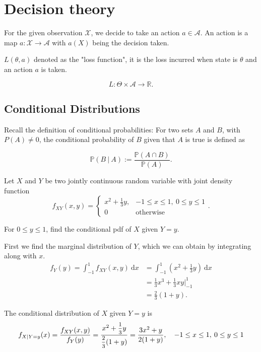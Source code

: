 \chapter{Decision theory}

For the given observation $\mathcal{X}$, we decide to take an action $a \in \mathcal{A}$.
An action is a map $a : \mathcal{X} \to \mathcal{A}$ with $a(X)$ being the decision taken.

$L(\theta, a)$ denoted as the "loss function", it is the loss incurred when state is $\theta$ 
and an action $a$ is taken.

\begin{equation}
    L : \Theta \times \mathcal{A} \to \mathbb{R}.
\end{equation}

\section{Conditional Distributions}

Recall the definition of conditional probabilities: For two sets 
$A$ and $B$, with $P(A) \neq 0$, the conditional probability of $B$ 
given that $A$ is true is defined as 

\begin{equation}
    \mathbb{P}(B \> | \> A) := \frac{\mathbb{P}(A \cap B)}{\mathbb{P}(A)}.
\end{equation}

\begin{example}
    Let $X$ and $Y$ be two jointly continuous random variable with joint density function
    \[
        f_{XY}(x, y) = \begin{cases}
            x^2 + \frac{1}{3}y, & -1 \leq x \leq 1,\> 0 \leq y \leq 1\\
            0 & \text{otherwise}
        \end{cases}.
    \]

    For $0 \leq y \leq 1$, find the conditional pdf of $X$ given $Y = y$.
\end{example}
\begin{solution}
    First we find the marginal distribution of $Y$, which we can obtain by integrating 
    along with $x$.
    \begin{align*}
        f_Y(y) = \int_{-1}^{1} f_{XY}(x,y)\> \mathrm{d}x &= 
        \int_{-1}^{1} \left( x^2 + \frac{1}{3}y \right) \> \mathrm{d}x\\
        &= \frac{1}{3}x^3 + \frac{1}{3}xy \bigg \vert^1_{-1}\\
        &= \frac{2}{3}(1+y).
    \end{align*}

    The conditional distribution of $X$ given $Y=y$ is 
    \[
        f_{X|Y=y}(x) = \frac{f_{XY}(x,y)}{f_Y(y)} 
        = \frac{x^2 + \mfrac{1}{3}y}{\mfrac{2}{3}(1+y)}
        = \frac{3x^2 + y}{2(1+y)}, \quad -1 \leq x \leq 1,\> 0 \leq y \leq 1
    \]
\end{solution}


